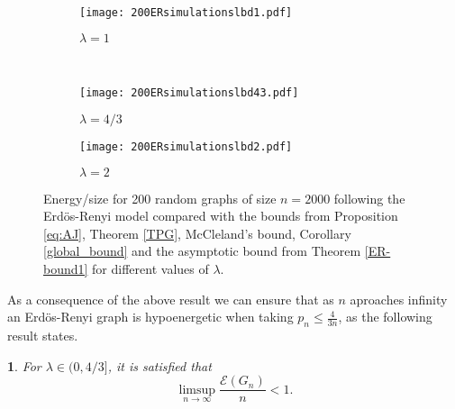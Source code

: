 \documentclass[a4paper]{article}
\newcommand{\energy}[1]{\mathcal{E}\left(#1\right)}
\theoremstyle{plain}
\newtheorem{theorem}{\protect\thmaname}
\renewcommand{\thmaname}{Theorem}%
\renewcommand{\thmaname}{Teorema}%
\begin{document}
\begin{figure}[!ht]
    \centering

    \begin{subfigure}[t]{0.49\textwidth}
        \centering
        \texttt{[image: 200ERsimulationslbd1.pdf]}
        \caption{$\lambda = 1$}
    \end{subfigure}%
    ~
    \begin{subfigure}[t]{0.49\textwidth}
        \centering
        \texttt{[image: 200ERsimulationslbd43.pdf]}
        \caption{$\lambda = 4/3$}
    \end{subfigure}
    
    \begin{subfigure}[t]{0.49\textwidth}
        \centering
        \texttt{[image: 200ERsimulationslbd2.pdf]}
        \caption{$\lambda = 2$}
    \end{subfigure}
    
    \caption{Energy/size for 200 random graphs of size \(n = 2000\) following the Erd\"os-Renyi model compared with the bounds from Proposition \ref{eq:AJ}, Theorem \ref{TPG}, McCleland's bound, Corollary \ref{global_bound} and the asymptotic bound from Theorem \ref{ER-bound1} for different values of $\lambda$.}
\end{figure}

As a consequence of the above result we can ensure that as $n$ aproaches infinity an Erd\"os-Renyi graph is hypoenergetic when taking $p_n \leq \frac{4}{3n}$, as the following result states.

\begin{theorem}\label{ER-hipoenergetic}
For \(\lambda \in (0,4/3]\), it is satisfied that
\[
    \limsup_{n \to \infty} \frac{\energy{G_n}}{n} < 1.
\]
\end{theorem}
\end{document}
